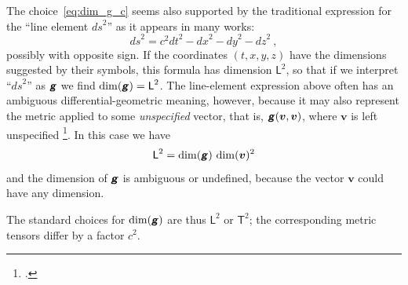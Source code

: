 \documentclass[\ifafour a4paper,12pt,\else a5paper,10pt,\fi%
onecolumn,oneside,article,%
british%
]{memoir}
\theoremstyle{remark}
\theoremstyle{innote}
\newcommand*{\mathte}[1]{\textbf{\textit{\textsf{#1}}}}
\newcommand*{\citep}{\footcites}
\renewcommand*{\|}[1][]{\nonscript\,#1\vert\nonscript\;\mathopen{}}
\newcommand*{\sect}{\S}%
\newcommand*{\cf}{{cf.}}
\newcommand*{\Le}{\textsf{L}}
\newcommand*{\Ti}{\textsf{T}}
\newcommand*{\yg}{\mathte{g}}
\newcommand*{\ygc}{\mathte{g}}
\newcommand*{\yv}{\bm{v}}
\newcommand*{\ds}{\mathit{ds}}
\begin{document}
The choice~\eqref{eq:dim_g_c} seems also supported by the traditional
expression for the \enquote{line element $\ds^{2}$} as it appears in many
works:
\begin{equation}
  \label{eq:line_elem}
  \ds^{2} = c^2\mathit{dt}^2 - \mathit{dx}^2 -\mathit{dy}^2 - \mathit{dz}^2
  \ ,
\end{equation}
possibly with opposite sign. If the coordinates $(t,x,y,z)$ have the
dimensions suggested by their symbols, this formula has dimension
$\Le^{2}$, so that if we interpret \enquote{$\ds^{2}$} as $\ygc$ we find
$\dim(\ygc) = \Le^{2}$. The line-element expression above often has an
ambiguous differential-geometric meaning, however, because it may also
represent the metric applied to some \emph{unspecified} vector, that is,
$\yg(\yv,\yv)$, where $\yv$ is left unspecified \citep[\cf][Box~3.2~D
p.~77]{misneretal1970_r1973}. In this case we have
\begin{equation*}
  \label{eq:line_elem_dim_ambiguous}
  \Le^{2} = \dim(\yg)\,\dim(\yv)^{2}
\end{equation*}
and the dimension of $\yg$ is ambiguous or undefined, because the vector
$\yv$ could have any dimension.%

\medskip

The standard choices for $\dim(\yg)$ are thus $\Le^{2}$ or $\Ti^{2}$; the
corresponding metric tensors differ by a factor $c^{2}$.
\end{document}
